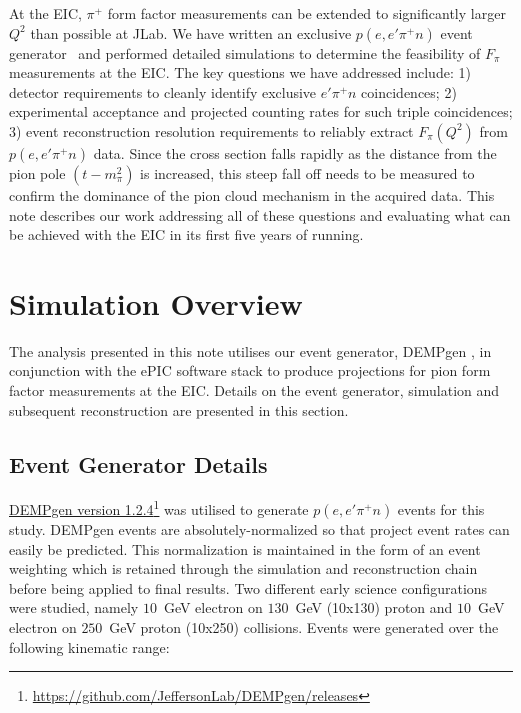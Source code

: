 \documentclass[letterpaper,12pt]{article}
\begin{document}
At the EIC, $\pi^+$ form factor measurements can be extended to significantly larger $Q^2$ than possible at JLab.  We have written an exclusive $p(e,e'\pi^+n)$ event generator~\cite{DEMPgen} and performed detailed simulations to determine the feasibility of $F_{\pi}$ measurements at the EIC\@.  The key questions we have addressed include: 1) detector requirements to cleanly identify exclusive $e' \pi^+ n$ coincidences; 2) experimental acceptance and projected counting rates for such triple coincidences; 3) event reconstruction resolution requirements to reliably extract $F_{\pi}(Q^2)$ from $p(e,e'\pi^+n)$ data. Since the cross section falls rapidly as the distance from the pion pole $(t-m_{\pi}^2)$ is increased, this steep fall off needs to be measured to confirm the dominance of the pion cloud mechanism in the acquired data. This note describes our work addressing all of these questions and evaluating what can be achieved with the EIC in its first five years of running.

\section{Simulation Overview}\label{sec:Sim_Overview}

The analysis presented in this note utilises our event generator, DEMPgen \cite{DEMPgen}, in conjunction with the ePIC software stack to produce projections for pion form factor measurements at the EIC. Details on the event generator, simulation and subsequent reconstruction are presented in this section.

\subsection{Event Generator Details}\label{subsec:EvGen}

\href{https://github.com/JeffersonLab/DEMPgen/releases}{DEMPgen version 1.2.4}\footnote{\url{https://github.com/JeffersonLab/DEMPgen/releases}} was utilised to generate $p(e,e'\pi^+n)$ events for this study. DEMPgen events are absolutely-normalized so that project event rates can easily be predicted. This normalization is maintained in the form of an event weighting which is retained through the simulation and reconstruction chain before being applied to final results. Two different early science configurations were studied, namely $10$~GeV electron on $130$~GeV (10x130) proton and $10$~GeV electron on $250$~GeV proton (10x250) collisions. Events were generated over the following kinematic range:
\end{document}
